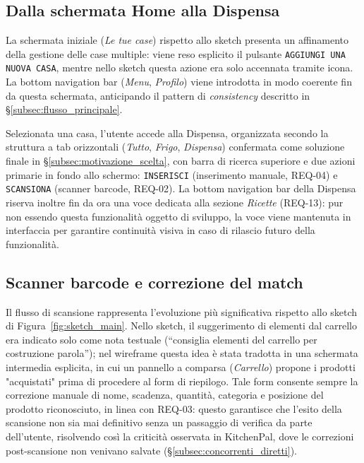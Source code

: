 \documentclass[11pt,a4paper]{article}
\begin{document}
\subsection{Dalla schermata Home alla Dispensa}

La schermata iniziale (\emph{Le tue case}) rispetto allo sketch presenta un affinamento della gestione delle case multiple: viene reso esplicito il
pulsante \texttt{AGGIUNGI UNA NUOVA CASA}, mentre nello sketch questa azione era solo accennata tramite icona. La bottom navigation bar (\emph{Menu},
\emph{Profilo}) viene introdotta in modo coerente fin da questa schermata, anticipando il pattern di \emph{consistency} descritto in \S\ref{subsec:flusso_principale}.

Selezionata una casa, l'utente accede alla Dispensa, organizzata secondo la struttura a tab orizzontali (\emph{Tutto}, \emph{Frigo}, \emph{Dispensa})
confermata come soluzione finale in \S\ref{subsec:motivazione_scelta}, con barra di ricerca superiore e due azioni primarie in fondo allo schermo: \texttt{INSERISCI} (inserimento manuale, REQ-04) e \texttt{SCANSIONA} (scanner barcode, REQ-02). La bottom navigation bar della Dispensa riserva inoltre fin da ora una voce dedicata alla sezione \emph{Ricette} (REQ-13): pur non essendo questa funzionalità oggetto di sviluppo, la voce viene mantenuta in interfaccia per garantire continuità visiva in caso di rilascio futuro della funzionalità.

\subsection{Scanner barcode e correzione del match}

Il flusso di scansione rappresenta l'evoluzione più significativa rispetto allo sketch di Figura~\ref{fig:sketch_main}. Nello sketch, il suggerimento di elementi dal
carrello era indicato solo come nota testuale (``consiglia elementi del carrello per costruzione parola''); nel wireframe questa idea è stata
tradotta in una schermata intermedia esplicita, in cui un pannello a comparsa (\emph{Carrello}) propone i prodotti "acquistati" prima di
procedere al form di riepilogo. Tale form consente sempre la correzione manuale di nome, scadenza, quantità, categoria e posizione del prodotto
riconosciuto, in linea con REQ-03: questo garantisce che l'esito della scansione non sia mai definitivo senza un passaggio di verifica da parte
dell'utente, risolvendo così la criticità osservata in KitchenPal, dove le correzioni post-scansione non venivano salvate (\S\ref{subsec:concorrenti_diretti}).
\end{document}
